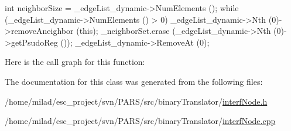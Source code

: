 \begin{DoxyCode}
                                  {
        int neighborSize = _edgeList_dynamic->NumElements ();
        while (_edgeList_dynamic->NumElements () > 0) {
                _edgeList_dynamic->Nth (0)->removeAneighbor (this);
                _neighborSet.erase (_edgeList_dynamic->Nth (0)->getPsudoReg ());
                _edgeList_dynamic->RemoveAt (0);
        }
}
\end{DoxyCode}


Here is the call graph for this function:




The documentation for this class was generated from the following files:\begin{DoxyCompactItemize}
\item 
/home/milad/esc\_\-project/svn/PARS/src/binaryTranslator/\hyperlink{interfNode_8h}{interfNode.h}\item 
/home/milad/esc\_\-project/svn/PARS/src/binaryTranslator/\hyperlink{interfNode_8cpp}{interfNode.cpp}\end{DoxyCompactItemize}
